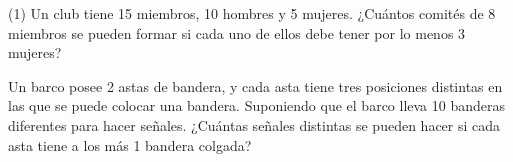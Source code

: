 \documentclass[]{srs}
\begin{document}
\begin{preguntas}(1)
  \pregunta Un club tiene 15 miembros, 10 hombres y 5 mujeres. ¿Cuántos comités de 8
  miembros se pueden formar si cada uno de ellos debe tener por lo menos 3 mujeres?
  \begin{malla}[height=10cm]
  \end{malla}
  \pregunta Un barco posee 2 astas de bandera, y cada asta tiene tres posiciones distintas
  en las que se puede colocar una bandera. Suponiendo que el barco lleva 10 banderas
  diferentes para hacer señales. ¿Cuántas señales distintas se pueden hacer si cada
  asta tiene a los más 1 bandera colgada?
  \begin{malla}[height=14cm]
  \end{malla}
\end{preguntas}
\end{document}
